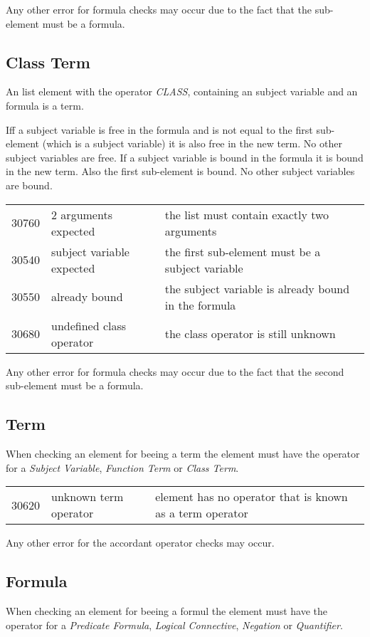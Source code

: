 \documentclass[a4paper,german,10pt,twoside]{book}
\theoremstyle{definition}
\theoremstyle{remark}
\begin{document}
\par
Any other error for formula checks may occur due to the fact that the sub-element must be a formula.


\subsection{Class Term
}
An list element with the operator \emph{CLASS}, containing an subject variable and an formula is a term.

\par
Iff a subject variable is free in the formula and is not equal to the first sub-element (which is a subject variable) it is also free in the new term. No other subject variables are free. If a subject variable is bound in the formula it is bound in the new term. Also the first sub-element is bound. No other subject variables are bound.


\begin{tabularx}{\linewidth}{llX}
  30760  & $2$ arguments expected & the list must contain exactly two arguments \\
  30540  & subject variable expected & the first sub-element must be a subject variable \\
  30550  & already bound & the subject variable is already bound in the formula \\
  30680  & undefined class operator & the class operator is still unknown
\end{tabularx}

\par
Any other error for formula checks may occur due to the fact that the second sub-element must be a formula.


\subsection{Term
}
When checking an element for beeing a term the element must have the operator for a \emph{Subject Variable}, \emph{Function Term} or \emph{Class Term}.

\begin{tabularx}{\linewidth}{llX}
  30620  & unknown term operator & element has no operator that is known as a term operator
\end{tabularx}

\par
Any other error for the accordant operator checks may occur.


\subsection{Formula
}
When checking an element for beeing a formul the element must have the operator for a \emph{Predicate Formula}, \emph{Logical Connective}, \emph{Negation} or \emph{Quantifier}.
\end{document}
